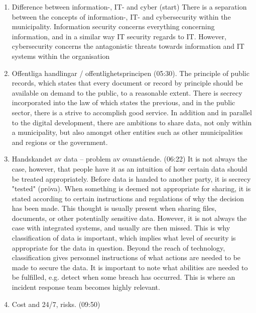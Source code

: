 \documentclass{article}
\begin{document}
\begin{enumerate}
    \item Difference between information-, IT- and cyber (start)
    There is a separation between the concepts of information-, IT- and cybersecurity within the municipality.
Information security concerns everything concerning information, and in a similar way IT security regards to IT.
However, cybersecurity concerns the antagonistic threats towards information and IT systems within the organisation
    \item Offentliga handlingar / offentlighetsprincipen (05:30).
    The principle of public records, which states that every document or record by principle should be available on demand to the public, to a reasonable extent.
    There is secrecy incorporated into the law of which states the previous, and in the public sector, there is a strive to accomplish good service.
    In addition and in parallel to the digital development, there are ambitions to share data, not only within a municipality, but also amongst other entities such as other municipalities and regions or the government.
    \item Handskandet av data -- problem av ovanstående. (06:22)
    It is not always the case, however, that people have it as an intuition of how certain data should be treated appropriately.
    Before data is handed to another party, it is secrecy "tested" (pröva).
    When something is deemed not appropriate for sharing, it is stated according to certain instructions and regulations of why the decision has been made.
    This thought is usually present when sharing files, documents, or other potentially sensitive data.
    However, it is not always the case with integrated systems, and usually are then missed.
    This is why classification of data is important, which implies what level of security is appropriate for the data in question.
    Beyond the reach of technology, classification gives personnel instructions of what actions are needed to be made to secure the data.
    It is important to note what abilities are needed to be fulfilled, e.g. detect when some breach has occurred.
    This is where an incident response team becomes highly relevant.
    \item Cost and 24/7, risks. (09:50)
    

\end{enumerate}
\end{document}
